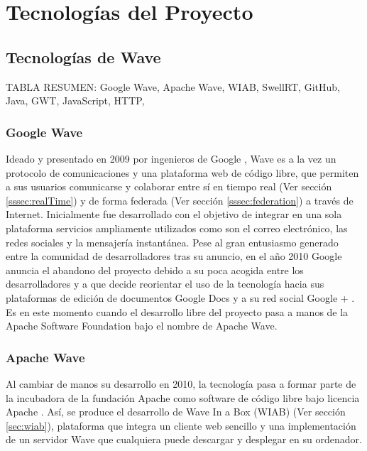 \newpage
\thispagestyle{sectioned}
\chapter{Tecnologías del Proyecto}
 
\section{Tecnologías de Wave}

  TABLA RESUMEN: Google Wave, Apache Wave, WIAB, SwellRT, GitHub, Java, GWT, JavaScript, HTTP, 
  
  \subsection{Google Wave}

  Ideado y presentado en 2009 por ingenieros de Google \cite{ref:wave_announcement}, Wave es a la vez un protocolo de comunicaciones \cite{ref:wave_over_xmpp} y una plataforma web de código libre, que permiten a sus usuarios comunicarse y colaborar entre sí en tiempo real (Ver sección \ref{sssec:realTime}) y de forma federada (Ver sección \ref{sssec:federation}) a través de Internet. 
  Inicialmente fue desarrollado con el objetivo de integrar en una sola plataforma servicios ampliamente utilizados como son el correo electrónico, las redes sociales y la mensajería instantánea. Pese al gran entusiasmo generado entre la comunidad de desarrolladores tras su anuncio, en el año 2010 Google anuncia el abandono del proyecto \cite{ref:google_wave_end} debido a su poca acogida entre los desarrolladores y a que decide reorientar el uso de la tecnología hacia sus plataformas de edición de documentos Google Docs \cite{ref:google_docs} y a su red social Google + \cite{ref:google_plus}.  Es en este momento cuando el desarrollo libre del proyecto pasa a manos de la Apache Software Foundation bajo el nombre de Apache Wave.

  \subsection{Apache Wave}
  
  Al cambiar de manos su desarrollo en 2010, la tecnología pasa a formar parte de la incubadora de la fundación Apache \cite{ref:apache_wave_about} como software de código libre bajo licencia Apache \cite{ref:apache_license}. Así, se produce el desarrollo de Wave In a Box (WIAB) (Ver sección \ref{sec:wiab}), plataforma que integra un cliente web sencillo y una implementación de un servidor Wave que cualquiera puede descargar y desplegar en su ordenador.
  
